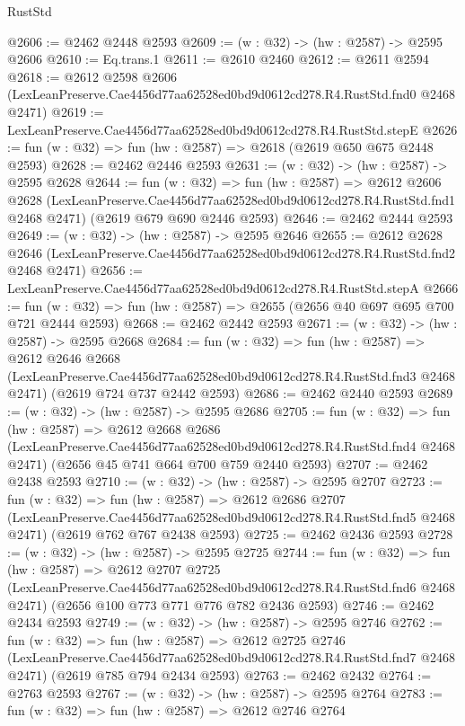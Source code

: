 \begin{lexlean}{RustStd}
\begin{coremodule}
@2606 := @2462 @2448 @2593
@2609 := (w : @32) -> (hw : @2587) -> @2595 @2606
@2610 := Eq.trans.{1}
@2611 := @2610 @2460
@2612 := @2611 @2594
@2618 := @2612
    @2598
    @2606
    (LexLeanPreserve.Cae4456d77aa62528ed0bd9d0612cd278.R4.RustStd.fnd0 @2468 @2471)
@2619 := LexLeanPreserve.Cae4456d77aa62528ed0bd9d0612cd278.R4.RustStd.stepE
@2626 := fun (w : @32) => fun (hw : @2587) => @2618 (@2619 @650 @675 @2448 @2593)
@2628 := @2462 @2446 @2593
@2631 := (w : @32) -> (hw : @2587) -> @2595 @2628
@2644 := fun (w : @32) =>
  fun (hw : @2587) =>
  @2612
    @2606
    @2628
    (LexLeanPreserve.Cae4456d77aa62528ed0bd9d0612cd278.R4.RustStd.fnd1 @2468 @2471)
    (@2619 @679 @690 @2446 @2593)
@2646 := @2462 @2444 @2593
@2649 := (w : @32) -> (hw : @2587) -> @2595 @2646
@2655 := @2612
    @2628
    @2646
    (LexLeanPreserve.Cae4456d77aa62528ed0bd9d0612cd278.R4.RustStd.fnd2 @2468 @2471)
@2656 := LexLeanPreserve.Cae4456d77aa62528ed0bd9d0612cd278.R4.RustStd.stepA
@2666 := fun (w : @32) => fun (hw : @2587) => @2655 (@2656 @40 @697 @695 @700 @721 @2444 @2593)
@2668 := @2462 @2442 @2593
@2671 := (w : @32) -> (hw : @2587) -> @2595 @2668
@2684 := fun (w : @32) =>
  fun (hw : @2587) =>
  @2612
    @2646
    @2668
    (LexLeanPreserve.Cae4456d77aa62528ed0bd9d0612cd278.R4.RustStd.fnd3 @2468 @2471)
    (@2619 @724 @737 @2442 @2593)
@2686 := @2462 @2440 @2593
@2689 := (w : @32) -> (hw : @2587) -> @2595 @2686
@2705 := fun (w : @32) =>
  fun (hw : @2587) =>
  @2612
    @2668
    @2686
    (LexLeanPreserve.Cae4456d77aa62528ed0bd9d0612cd278.R4.RustStd.fnd4 @2468 @2471)
    (@2656 @45 @741 @664 @700 @759 @2440 @2593)
@2707 := @2462 @2438 @2593
@2710 := (w : @32) -> (hw : @2587) -> @2595 @2707
@2723 := fun (w : @32) =>
  fun (hw : @2587) =>
  @2612
    @2686
    @2707
    (LexLeanPreserve.Cae4456d77aa62528ed0bd9d0612cd278.R4.RustStd.fnd5 @2468 @2471)
    (@2619 @762 @767 @2438 @2593)
@2725 := @2462 @2436 @2593
@2728 := (w : @32) -> (hw : @2587) -> @2595 @2725
@2744 := fun (w : @32) =>
  fun (hw : @2587) =>
  @2612
    @2707
    @2725
    (LexLeanPreserve.Cae4456d77aa62528ed0bd9d0612cd278.R4.RustStd.fnd6 @2468 @2471)
    (@2656 @100 @773 @771 @776 @782 @2436 @2593)
@2746 := @2462 @2434 @2593
@2749 := (w : @32) -> (hw : @2587) -> @2595 @2746
@2762 := fun (w : @32) =>
  fun (hw : @2587) =>
  @2612
    @2725
    @2746
    (LexLeanPreserve.Cae4456d77aa62528ed0bd9d0612cd278.R4.RustStd.fnd7 @2468 @2471)
    (@2619 @785 @794 @2434 @2593)
@2763 := @2462 @2432
@2764 := @2763 @2593
@2767 := (w : @32) -> (hw : @2587) -> @2595 @2764
@2783 := fun (w : @32) =>
  fun (hw : @2587) =>
  @2612
    @2746
    @2764

\end{coremodule}
\end{lexlean}
